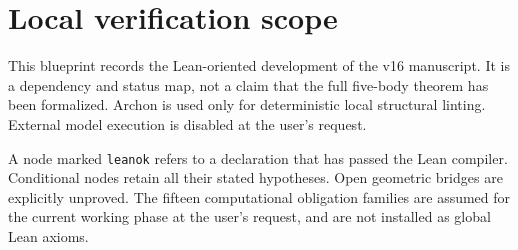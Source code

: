\chapter*{Local verification scope}
This blueprint records the Lean-oriented development of the v16 manuscript.
It is a dependency and status map, not a claim that the full five-body theorem
has been formalized. Archon is used only for deterministic local structural
linting. External model execution is disabled at the user's request.

A node marked \texttt{leanok} refers to a declaration that has passed the Lean
compiler. Conditional nodes retain all their stated hypotheses. Open geometric
bridges are explicitly unproved. The fifteen computational obligation families
are assumed for the current working phase at the user's request, and are not
installed as global Lean axioms.




